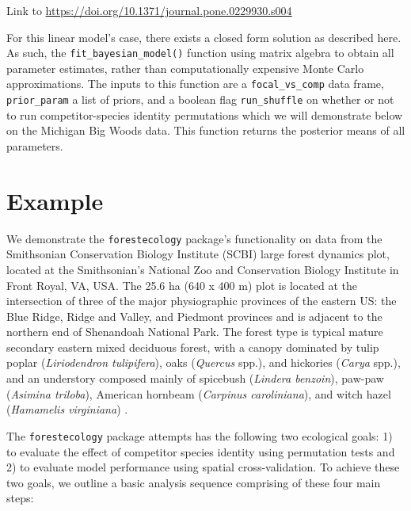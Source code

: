 \documentclass[12pt]{article}
\begin{document}
Link to \url{https://doi.org/10.1371/journal.pone.0229930.s004}

For this linear model's case, there exists a closed form solution as
described here. As such, the \texttt{fit\_bayesian\_model()} function
using matrix algebra to obtain all parameter estimates, rather than
computationally expensive Monte Carlo approximations. The inputs to this
function are a \texttt{focal\_vs\_comp} data frame,
\texttt{prior\_param} a list of priors, and a boolean flag
\texttt{run\_shuffle} on whether or not to run competitor-species
identity permutations which we will demonstrate below on the Michigan
Big Woods data. This function returns the posterior means of all
parameters.

\hypertarget{example}{%
\section{Example}\label{example}}

We demonstrate the \texttt{forestecology} package's functionality on
data from the Smithsonian Conservation Biology Institute (SCBI) large
forest dynamics plot, located at the Smithsonian's National Zoo and
Conservation Biology Institute in Front Royal, VA, USA. The 25.6 ha (640
x 400 m) plot is located at the intersection of three of the major
physiographic provinces of the eastern US: the Blue Ridge, Ridge and
Valley, and Piedmont provinces and is adjacent to the northern end of
Shenandoah National Park. The forest type is typical mature secondary
eastern mixed deciduous forest, with a canopy dominated by tulip poplar
(\emph{Liriodendron tulipifera}), oaks (\emph{Quercus} spp.), and
hickories (\emph{Carya} spp.), and an understory composed mainly of
spicebush (\emph{Lindera benzoin}), paw-paw (\emph{Asimina triloba}),
American hornbeam (\emph{Carpinus caroliniana}), and witch hazel
(\emph{Hamamelis virginiana}) \citet{bourg_initial_2013}.

The \texttt{forestecology} package attempts has the following two
ecological goals: 1) to evaluate the effect of competitor species
identity using permutation tests and 2) to evaluate model performance
using spatial cross-validation. To achieve these two goals, we outline a
basic analysis sequence comprising of these four main steps:
\end{document}
